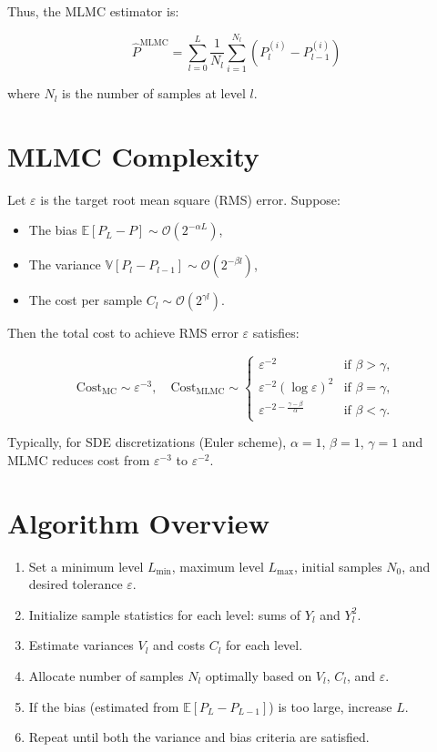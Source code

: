 \documentclass{article}
\begin{document}
Thus, the MLMC estimator is:

\begin{equation}
\hat{P}^{\text{MLMC}} = \sum_{l=0}^{L} \frac{1}{N_l} \sum_{i=1}^{N_l} (P_l^{(i)} - P_{l-1}^{(i)})
\end{equation}

where $N_l$ is the number of samples at level $l$.

\section{MLMC Complexity}
Let $\varepsilon $ is the target root mean square (RMS) error. Suppose:
\begin{itemize}
  \item The bias $\mathbb{E}[P_L - P] \sim \mathcal{O}(2^{-\alpha L})$,
  \item The variance $\mathbb{V}[P_l - P_{l-1}] \sim \mathcal{O}(2^{-\beta l})$,
  \item The cost per sample $C_l \sim \mathcal{O}(2^{\gamma l})$.
\end{itemize}

Then the total cost to achieve RMS error $\varepsilon$ satisfies:

\begin{equation}
\text{Cost}_{\text{MC}} \sim \varepsilon^{-3}, \quad \text{Cost}_{\text{MLMC}} \sim \begin{cases}
\varepsilon^{-2} & \text{if } \beta > \gamma, \\
\varepsilon^{-2} (\log \varepsilon)^2 & \text{if } \beta = \gamma, \\
\varepsilon^{-2-\frac{\gamma-\beta}{\alpha}} & \text{if } \beta < \gamma.
\end{cases}
\end{equation}

Typically, for SDE discretizations (Euler scheme), $\alpha=1$, $\beta=1$, $\gamma=1$ and MLMC reduces cost from $\varepsilon^{-3}$ to $\varepsilon^{-2}$.

\section{Algorithm Overview}

\begin{enumerate}
  \item Set a minimum level $L_{\text{min}}$, maximum level $L_{\text{max}}$, initial samples $N_0$, and desired tolerance $\varepsilon$.
  \item Initialize sample statistics for each level: sums of $Y_l$ and $Y_l^2$.
  \item Estimate variances $V_l$ and costs $C_l$ for each level.
  \item Allocate number of samples $N_l$ optimally based on $V_l$, $C_l$, and $\varepsilon$.
  \item If the bias (estimated from $\mathbb{E}[P_L - P_{L-1}]$) is too large, increase $L$.
  \item Repeat until both the variance and bias criteria are satisfied.
\end{enumerate}
\end{document}
